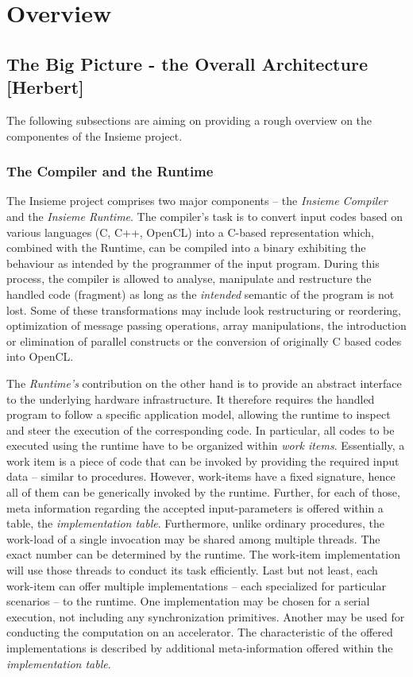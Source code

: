 \chapter{Overview} \label{cap:overview}

\section{The Big Picture - the Overall Architecture [Herbert]}
The following subsections are aiming on providing a rough overview on the
componentes of the Insieme project.

\subsection{The Compiler and the Runtime}
The Insieme project comprises two major components -- the \textit{Insieme
Compiler} and the \textit{Insieme Runtime}. The compiler's task is to convert
input codes based on various languages (C, C++, OpenCL) into a C-based
representation which, combined with the Runtime, can be compiled into a binary
exhibiting the behaviour as intended by the programmer of the input program.
During this process, the compiler is allowed to analyse, manipulate and
restructure the handled code (fragment) as long as the \textit{intended}
semantic of the program is not lost. Some of these transformations may include
look restructuring or reordering, optimization of message passing operations,
array manipulations, the introduction or elimination of parallel constructs or
the conversion of originally C based codes into OpenCL. 

The \textit{Runtime's} contribution on the other hand is to provide an abstract
interface to the underlying hardware infrastructure. It therefore requires the
handled program to follow a specific application model, allowing the runtime to
inspect and steer the execution of the corresponding code. In particular, all
codes to be executed using the runtime have to be organized within \textit{work
items}.  Essentially, a work item is a piece of code that can
be invoked by providing the required input data -- similar to procedures.
However, work-items have a fixed signature, hence all of them can be generically
invoked by the runtime. Further, for each of those, meta information regarding
the accepted input-parameters is offered within a table, the
\textit{implementation table}. Furthermore, unlike ordinary procedures, the
work-load of a single invocation may be shared among multiple threads. The exact
number can be determined by the runtime. The work-item implementation will use
those threads to conduct its task efficiently. Last but not least, each
work-item can offer multiple implementations -- each specialized for particular
scenarios -- to the runtime. One implementation may be chosen for a serial
execution, not including any synchronization primitives. Another may be used for
conducting the computation on an accelerator. The characteristic of the offered
implementations is described by additional meta-information offered within the
\textit{implementation table}.

